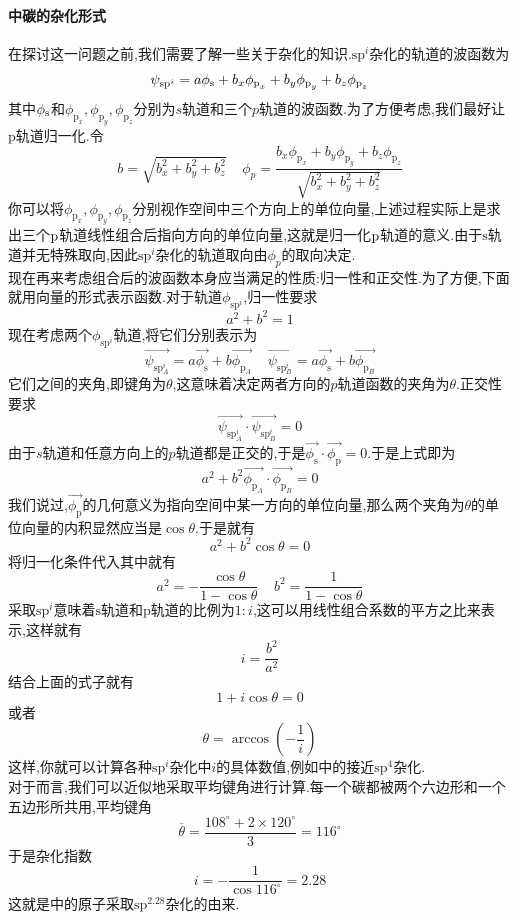 \documentclass{ctexart}
\begin{document}
\paragraph{中碳的杂化形式}
在探讨这一问题之前,我们需要了解一些关于杂化的知识.$\text{sp}^i$杂化的轨道的波函数为
\[\psi_{\text{sp}^i}=a\phi_{\text s}+b_x\phi_{\text{p}_x}+b_y\phi_{\text{p}_y}+b_z\phi_{\text{p}_z}\]
其中$\phi_{\text s}$和$\phi_{\text{p}_x},\phi_{\text{p}_y},\phi_{\text{p}_z}$分别为$s$轨道和三个$p$轨道的波函数.为了方便考虑,我们最好让$\text{p}$轨道归一化.令
\[b=\sqrt{b_x^2+b_y^2+b_z^2}\ \ \ \ \ \phi_{p}=\dfrac{b_x\phi_{\text{p}_x}+b_y\phi_{\text{p}_y}+b_z\phi_{\text{p}_z}}{\sqrt{b_x^2+b_y^2+b_z^2}}\]
你可以将$\phi_{\text{p}_x},\phi_{\text{p}_y},\phi_{\text{p}_z}$分别视作空间中三个方向上的单位向量,上述过程实际上是求出三个$\text p$轨道线性组合后指向方向的单位向量,这就是归一化$\text p$轨道的意义.由于$\text{s}$轨道并无特殊取向,因此$\text{sp}^i$杂化的轨道取向由$\phi_p$的取向决定.\\
\indent 现在再来考虑组合后的波函数本身应当满足的性质:归一性和正交性.为了方便,下面就用向量的形式表示函数.对于轨道$\phi_{\text{sp}^i}$,归一性要求
\[a^2+b^2=1\]
现在考虑两个$\phi_{\text{sp}^i}$轨道,将它们分别表示为
\[\overrightarrow{\psi_{\text{sp}^i_A}}=a\overrightarrow{\phi_{\text{s}}}+b\overrightarrow{\phi_{\text{p}_A}}\ \ \ \ \ \overrightarrow{\psi_{\text{sp}^i_B}}=a\overrightarrow{\phi_{\text{s}}}+b\overrightarrow{\phi_{\text{p}_B}}\]
它们之间的夹角,即键角为$\theta$,这意味着决定两者方向的$p$轨道函数的夹角为$\theta$.正交性要求
\[\overrightarrow{\psi_{\text{sp}^i_A}}\cdot\overrightarrow{\psi_{\text{sp}^i_B}}=0\]
由于$s$轨道和任意方向上的$p$轨道都是正交的,于是$\overrightarrow{\phi_{\text{s}}}\cdot\overrightarrow{\phi_{\text{p}}}=0$.于是上式即为
\[a^2+b^2\overrightarrow{\phi_{\text{p}_A}}\cdot\overrightarrow{\phi_{\text{p}_B}}=0\]
我们说过,$\overrightarrow{\phi_{\text{p}}}$的几何意义为指向空间中某一方向的单位向量,那么两个夹角为$\theta$的单位向量的内积显然应当是$\cos\theta$.于是就有
\[a^2+b^2\cos\theta=0\]
将归一化条件代入其中就有
\[a^2=-\dfrac{\cos\theta}{1-\cos\theta}\ \ \ \ \ b^2=\dfrac{1}{1-\cos\theta}\]
采取$\text{sp}^i$意味着$\text{s}$轨道和$\text{p}$轨道的比例为$1:i$,这可以用线性组合系数的平方之比来表示,这样就有
\[i=\dfrac{b^2}{a^2}\]
结合上面的式子就有
\[1+i\cos\theta=0\]
或者
\[\theta=\arccos\left(-\dfrac1i\right)\]
这样,你就可以计算各种$\text{sp}^i$杂化中$i$的具体数值,例如中的接近$\text{sp}^4$杂化.\\
\indent 对于而言,我们可以近似地采取平均键角进行计算.每一个碳都被两个六边形和一个五边形所共用,平均键角
\[\overline{\theta}=\dfrac{108^\circ+2\times120^\circ}{3}=116^\circ\]
于是杂化指数
\[i=-\dfrac{1}{\cos116^\circ}=2.28\]
这就是中的原子采取$\text{sp}^{2.28}$杂化的由来.
\end{document}
